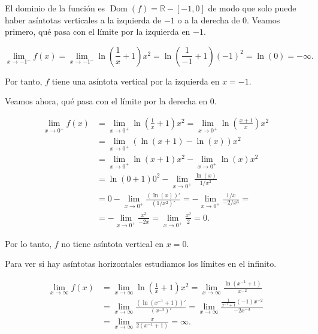 \documentclass[
  spanish,
  a4paper,
]{scrreport}
\theoremstyle{definition}
\theoremstyle{remark}
\begin{document}
\begin{tcolorbox}[enhanced jigsaw, arc=.35mm, bottomrule=.15mm, bottomtitle=1mm, breakable, colback=white, colbacktitle=quarto-callout-tip-color!10!white, colframe=quarto-callout-tip-color-frame, coltitle=black, left=2mm, leftrule=.75mm, opacityback=0, opacitybacktitle=0.6, rightrule=.15mm, title=\textcolor{quarto-callout-tip-color}{\faLightbulb}\hspace{0.5em}{Solución}, titlerule=0mm, toprule=.15mm, toptitle=1mm]

El dominio de la función es
\(\operatorname{Dom}(f) = \mathbb{R}-[-1,0]\) de modo que solo puede
haber asíntotas verticales a la izquierda de \(-1\) o a la derecha de
\(0\). Veamos primero, qué pasa con el límite por la izquierda en
\(-1\).

\[
\lim_{x\to -1^-}f(x) = \lim_{x\to -1^-}\ln\left(\frac{1}{x}+1\right)x^2 = \ln\left(\frac{1}{-1}+1\right)(-1)^2 = \ln(0) = -\infty.
\]

Por tanto, \(f\) tiene una asíntota vertical por la izquierda en
\(x=-1\).

Veamos ahora, qué pasa con el límite por la derecha en \(0\).

\begin{align*}
\lim_{x\to 0^+}f(x) &= \lim_{x\to 0^+}\ln\left(\frac{1}{x}+1\right)x^2 = \lim_{x\to 0^+}\ln\left(\frac{x+1}{x}\right)x^2 \\ 
&= \lim_{x\to 0^+} (\ln(x+1)-\ln(x))x^2 \\ 
&= \lim_{x\to 0^+}\ln(x+1)x^2 - \lim_{x\to 0^+}\ln(x)x^2\\ 
&= \ln(0+1)0^2 - \lim_{x\to 0^+}\frac{\ln(x)}{1/x^2} \\
&= 0 - \lim_{x\to 0^+}\frac{(\ln(x))'}{(1/x^2)'} = -\lim_{x\to 0^+} \frac{1/x}{-2/x^3} = \tag{L'Hôpital}\\
&= -\lim_{x\to 0^+} \frac{x^3}{-2x} = \lim_{x\to 0^+}\frac{x^2}{2} = 0.
\end{align*}

Por lo tanto, \(f\) no tiene asíntota vertical en \(x=0\).

Para ver si hay asíntotas horizontales estudiamos los límites en el
infinito.

\begin{align*}
\lim_{x\to \infty} f(x) &= \lim_{x\to \infty}\ln\left(\frac{1}{x}+1\right)x^2 = \lim_{x\to\infty} \frac{\ln(x^{-1}+1)}{x^{-2}}\\ 
&= \lim_{x\to\infty} \frac{(\ln(x^{-1}+1))'}{(x^{-2})'} \tag{L'Hôpital} = \lim_{x\to\infty} \frac{\frac{1}{x^{-1}+1}(-1)x^{-2}}{-2x^{-3}}\\  
&= \lim_{x\to \infty} \frac{x}{2(x^{-1}+1)} = \infty.
\end{align*}


\end{tcolorbox}
\end{document}
